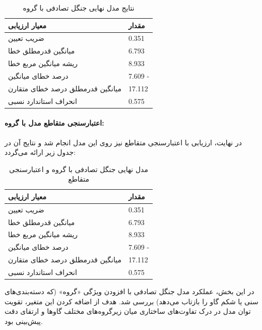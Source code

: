 \begin{table}[H]
	\centering
	\caption{نتایج مدل نهایی جنگل تصادفی با گروه}
	\renewcommand{\arraystretch}{1.3}
	\begin{tabular}{>{\centering\arraybackslash}m{4cm} >{\centering\arraybackslash}m{3cm}}
		\toprule
		\textbf{معیار ارزیابی} & \textbf{مقدار} \\
		\midrule
		ضریب تعیین & \num{0.351} \\
		میانگین قدرمطلق خطا & \num{6.793} \\
		ریشه میانگین مربع خطا & \num{8.933} \\
		درصد خطای میانگین & \num{7.609} - \\
		میانگین قدرمطلق درصد خطای متقارن & \num{17.112} \\
		انحراف استاندارد نسبی & \num{0.575} \\
		\bottomrule
	\end{tabular}
	\label{tab:rf_grp_final}
\end{table}

\paragraph{اعتبارسنجی متقاطع مدل با گروه:} در نهایت، ارزیابی با اعتبارسنجی متقاطع نیز روی این مدل انجام شد و نتایج آن در جدول زیر ارائه می‌گردد:

\begin{table}[H]
	\centering
	\caption{مدل نهایی جنگل تصادفی با گروه و اعتبارسنجی متقاطع}
	\renewcommand{\arraystretch}{1.3}
	\begin{tabular}{>{\centering\arraybackslash}m{4cm} >{\centering\arraybackslash}m{3cm}}
		\toprule
		\textbf{معیار ارزیابی} & \textbf{مقدار} \\
		\midrule
		ضریب تعیین & \num{0.351} \\
		میانگین قدرمطلق خطا & \num{6.793} \\
		ریشه میانگین مربع خطا & \num{8.933} \\
		درصد خطای میانگین & \num{7.609} - \\
		میانگین قدرمطلق درصد خطای متقارن & \num{17.112} \\
		انحراف استاندارد نسبی & \num{0.575} \\
		\bottomrule
	\end{tabular}
	\label{tab:rf_grp_cv_final}
\end{table}



در این بخش، عملکرد مدل جنگل تصادفی با افزودن ویژگی «گروه» (که دسته‌بندی‌های سنی یا شکم گاو را بازتاب می‌دهد) بررسی شد. هدف از اضافه کردن این متغیر، تقویت توان مدل در درک تفاوت‌های ساختاری میان زیرگروه‌های مختلف گاوها و ارتقای دقت پیش‌بینی بود.

